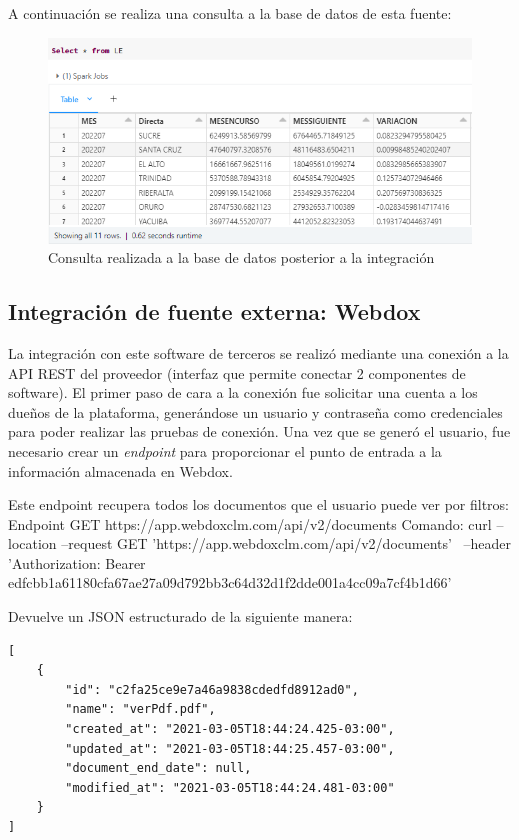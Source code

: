 A continuación se realiza una consulta a la base de datos de esta fuente:

\vspace{1cm}
\begin{figure}[htbp]
	\centering
	\includegraphics[width=1.0\textwidth]{./Figures/LE1.png}
	\caption{Consulta realizada a la base de datos posterior a la integración}
	\label{fig:LE1}
\end{figure}
\vspace{1cm}



\subsection{Integración de fuente externa: Webdox}
La integración con este software de terceros se realizó mediante una conexión a la API REST del proveedor (interfaz que permite conectar 2 componentes de software). 
El primer paso de cara a la conexión fue solicitar una cuenta a los dueños de la plataforma, generándose un usuario y contraseña como credenciales para poder realizar las pruebas de conexión. 
Una vez que se generó el usuario, fue necesario crear un \textit{endpoint} para proporcionar el punto de entrada a la información almacenada en Webdox. 



Este endpoint recupera todos los documentos que el usuario puede ver por filtros:
Endpoint GET https://app.webdoxclm.com/api/v2/documents
Comando: curl --location --request GET 'https://app.webdoxclm.com/api/v2/documents' \
--header 'Authorization: Bearer edfcbb1a61180cfa67ae27a09d792bb3c64d32d1f2dde001a4cc09a7cf4b1d66'

Devuelve un JSON estructurado de la siguiente manera:
\begin{lstlisting}
[
    {
        "id": "c2fa25ce9e7a46a9838cdedfd8912ad0",
        "name": "verPdf.pdf",
        "created_at": "2021-03-05T18:44:24.425-03:00",
        "updated_at": "2021-03-05T18:44:25.457-03:00",
        "document_end_date": null,
        "modified_at": "2021-03-05T18:44:24.481-03:00"
    }
]
\end{lstlisting}




